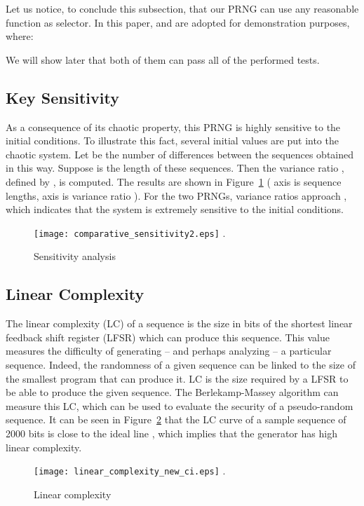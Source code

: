 \documentclass[journal]{IEEEtran}
\begin{document}
Let us notice, to conclude this subsection, that our PRNG can use any reasonable function as selector. In this paper,  and  are adopted for demonstration purposes, where:


We will show later that both of them can pass all of the performed tests. 



\subsection{Key Sensitivity}
As a consequence of its chaotic property, this PRNG is highly sensitive to the initial conditions. To illustrate this fact, several initial values are put into the chaotic system. Let  be the number
of differences between the sequences obtained in this way. Suppose  is the length of these
sequences. Then the variance ratio , defined by , is computed. The results are
shown in Figure~\ref{Sensitivity analysis} ( axis is sequence lengths,  axis is variance ratio ). For the two PRNGs, variance
ratios approach , which indicates that the system is extremely sensitive to the initial
conditions.

\begin{figure}
\centering
\texttt{[image: comparative\_sensitivity2.eps]}
\DeclareGraphicsExtensions.
\caption{Sensitivity analysis}
\label{Sensitivity analysis}
\end{figure}



\subsection{Linear Complexity}

The linear complexity (LC) of a sequence is the size in bits of the shortest linear feedback shift register (LFSR) which can produce this sequence. This value measures the difficulty of generating -- and perhaps analyzing -- a particular sequence.
Indeed, the randomness of a given sequence can be linked to the size of the smallest program that can produce it. LC is the size required by a LFSR to be able to produce the given sequence. The Berlekamp-Massey algorithm can measure this LC, which can be used to evaluate the security of a pseudo-random sequence.
It can be seen in Figure~\ref{Linear complexity} that the LC curve of a sample sequence of 2000 bits is close to the ideal line , which implies that the generator has high linear complexity.

\begin{figure}
\centering
\texttt{[image: linear\_complexity\_new\_ci.eps]}
\DeclareGraphicsExtensions.
\caption{Linear complexity}
\label{Linear complexity}
\end{figure}
\end{document}
